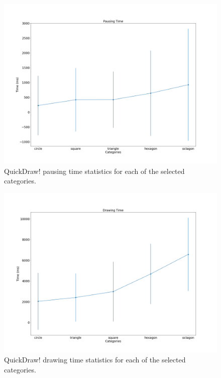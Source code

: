 \begin{figure}
    \centering
    \includegraphics[scale=0.4]{images/dataset/quickdraw_pausing_time.png}
    \caption{QuickDraw! pausing time statistics for each of the selected categories.}
    \label{fig:quickdraw_pausing_time}
\end{figure}

\begin{figure}
    \centering
    \includegraphics[scale=0.4]{images/dataset/quickdraw_drawing_time.png}
    \caption{QuickDraw! drawing time statistics for each of the selected categories.}
    \label{fig:quickdraw_drawing_time}
\end{figure}

